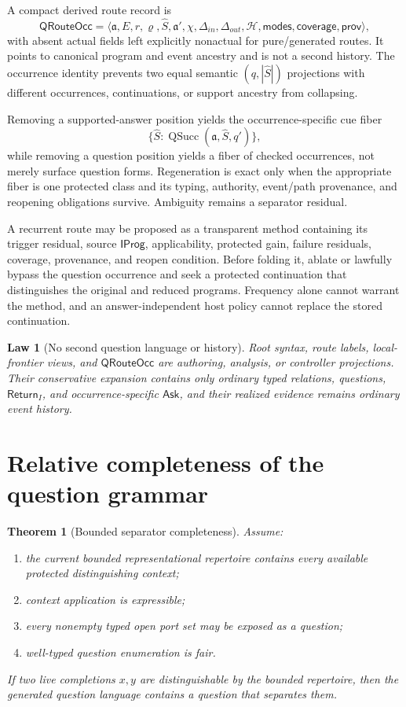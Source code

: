 \documentclass[11pt,oneside]{article}
\newtheorem{law}[definition]{Law}
\newtheorem{theorem}[definition]{Theorem}
\newcommand{\QSucc}{\operatorname{QSucc}}
\newcommand{\AskRef}{\mathfrak a}
\newcommand{\ResPath}{\varrho}
\begin{document}
A compact derived route record is
\[
\boxed{
\mathsf{QRouteOcc}
=
\langle
\AskRef,E,r,\ResPath,\widehat S,\AskRef',\chi,
\Delta_{in},\Delta_{out},\mathcal H,
\mathsf{modes},\mathsf{coverage},\mathsf{prov}
\rangle,
}
\]
with absent actual fields left explicitly nonactual for pure/generated routes.  It points to
canonical program and event ancestry and is not a second history.  The occurrence identity prevents
two equal semantic \((q,|\widehat S|)\) projections with different occurrences, continuations, or
support ancestry from collapsing.

Removing a supported-answer position yields the occurrence-specific cue fiber
\[
\{\widehat S:\QSucc(\AskRef,\widehat S,q')\},
\]
while removing a question position yields a fiber of checked occurrences, not merely surface
question forms.  Regeneration is exact only when the appropriate fiber is one protected class and
its typing, authority, event/path provenance, and reopening obligations survive.  Ambiguity remains
a separator residual.

A recurrent route may be proposed as a transparent method containing its trigger residual, source
\(\mathsf{IProg}\), applicability, protected gain, failure residuals, coverage, provenance, and
reopen condition.  Before folding it, ablate or lawfully bypass the question occurrence and seek a
protected continuation that distinguishes the original and reduced programs.  Frequency alone
cannot warrant the method, and an answer-independent host policy cannot replace the stored
continuation.

\begin{law}[No second question language or history]\label{law:no-second-question-language}
Root syntax, route labels, local-frontier views, and \(\mathsf{QRouteOcc}\) are authoring,
analysis, or controller projections.  Their conservative expansion contains only ordinary typed
relations, questions, \(\mathsf{Return}_I\), and occurrence-specific \(\mathsf{Ask}\), and their
realized evidence remains ordinary event history.
\end{law}

\section{Relative completeness of the question grammar}

\begin{theorem}[Bounded separator completeness]
Assume:
\begin{enumerate}
\item the current bounded representational repertoire contains every available protected distinguishing context;
\item context application is expressible;
\item every nonempty typed open port set may be exposed as a question;
\item well-typed question enumeration is fair.
\end{enumerate}
If two live completions \(x,y\) are distinguishable by the bounded repertoire, then the generated question language contains a question that separates them.
\end{theorem}
\end{document}
